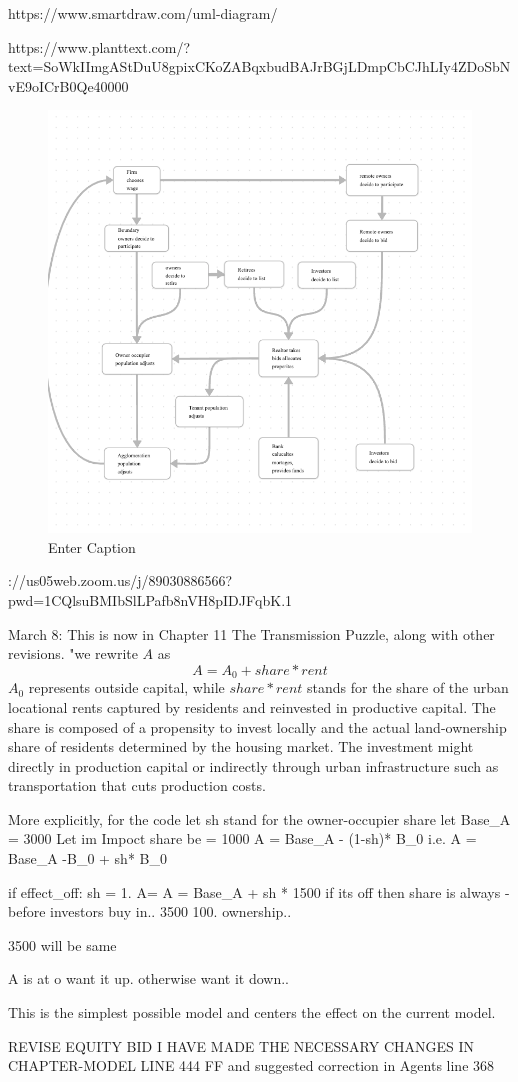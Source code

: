 
https://www.smartdraw.com/uml-diagram/

https://www.planttext.com/?text=SoWkIImgAStDuU8gpixCKoZABqxbudBAJrBGjLDmpCbCJhLIy4ZDoSbNvE9oICrB0Qe40000
\begin{figure}
    \centering
    \includegraphics[width=0.5\linewidth]{informationflows.png}
    \caption{Enter Caption}
    \label{fig:enter-label}
\end{figure}

\https://us05web.zoom.us/j/89030886566?pwd=1CQlsuBMIbSlLPafb8nVH8pIDJFqbK.1

March 8: This is now in Chapter 11
The Transmission Puzzle, along with other revisions.
"we rewrite $A$ as
\[ A= A_0 + share * rent\]
$A_0$ represents outside capital, while $share*rent$ stands for the share of the urban locational rents captured by residents and  reinvested in productive capital. The share is composed of a propensity to invest locally and the actual land-ownership share of residents determined by the housing market. The investment might directly in production capital or indirectly through urban infrastructure such as transportation that cuts production costs.

More explicitly, for the code let sh stand for the owner-occupier share let Base_A = 3000
Let im Impoct share  be   = 1000
A = Base_A - (1-sh)* B_0 
i.e.
A = Base_A -B_0 + sh* B_0  

if effect_off:
    sh = 1.  A=
A = Base_A + sh * 1500
if its off then share is always - before investors buy in.. 
3500 100. ownership.. 


3500 will be same 

A is at o want it up. otherwise want it down.. 


This is the simplest possible model and centers the effect on the current model.



REVISE EQUITY BID I HAVE MADE THE NECESSARY CHANGES IN CHAPTER-MODEL LINE 444 FF and suggested correction in Agents line 368

